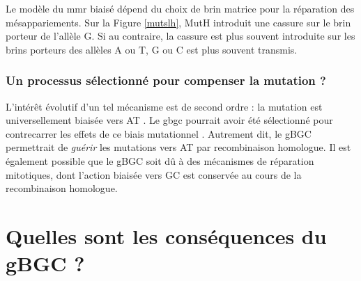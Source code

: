 \documentclass[11pt, oneside]{scrartcl}
\begin{document}
Le modèle du \ac{mmr} biaisé dépend du choix de brin matrice pour la réparation
des mésappariements. Sur la Figure \ref{mutslh}, MutH introduit une cassure sur
le brin porteur de l'allèle G. Si au contraire, la cassure est plus souvent
introduite sur les brins porteurs des allèles A ou T, G ou C est plus souvent
transmis. 

\subsubsection*{Un processus sélectionné pour compenser la mutation ?}
\label{sec:orgheadline10}

L'intérêt évolutif d'un tel mécanisme est de second ordre : la mutation est
universellement biaisée vers AT \cite{lynch_rate_2010,hershberg_evidence_2010}.
Le \ac{gbgc} pourrait avoir été sélectionné pour contrecarrer les effets de ce
biais mutationnel \cite{marais_biased_2003, birdsell_integrating_2002}.
Autrement dit, le gBGC permettrait de \emph{guérir} les mutations vers AT par
recombinaison homologue. Il est également possible que le gBGC soit dû à des
mécanismes de réparation mitotiques, dont l'action biaisée vers GC est conservée
au cours de la recombinaison homologue\cite{duret_biased_2009}.

\section{Quelles sont les conséquences du gBGC ?}
\label{sec:orgheadline17}
\end{document}
